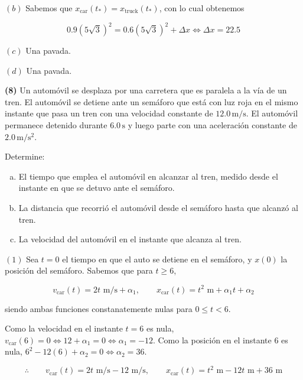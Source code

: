 \documentclass[12pt]{article}
\theoremstyle{definition}
\begin{document}
$(b)$ Sabemos que $x_{\text{car}}(t_*) = x_{\text{truck}}(t_*)$, con lo cual
obtenemos 

\begin{equation*}
    0.9(5\sqrt{3} )^2 = 0.6(5\sqrt{3} )^2 + \Delta x \iff \Delta x = 22.5
\end{equation*}

$(c)$ Una pavada. 

$(d)$ Una pavada.

\pagebreak 

\begin{shaded}
    \textbf{(8)} Un automóvil se desplaza por una carretera que es paralela a la vía de un tren. El automóvil se detiene ante un semáforo que está con luz roja en el mismo instante que pasa un tren con una velocidad constante de $12.0 \, \mathrm{m/s}$. El automóvil permanece detenido durante $6.0 \, \mathrm{s}$ y luego parte con una aceleración constante de $2.0 \, \mathrm{m/s^2}$.  

Determine:
\begin{enumerate}[(a)]
    \item El tiempo que emplea el automóvil en alcanzar al tren, medido desde el instante en que se detuvo ante el semáforo.
    \item La distancia que recorrió el automóvil desde el semáforo hasta que alcanzó al tren.
    \item La velocidad del automóvil en el instante que alcanza al tren.
\end{enumerate}
\end{shaded}

$(1)$ Sea $t = 0$ el tiempo en que el auto se detiene en el semáforo, y $x(0)$
la posición del semáforo. Sabemos que para $t \geq 6$,

\begin{equation*}
    v_{\text{car}}(t) = 2t \text{ m/s} + \alpha_1, \qquad x_{\text{car}}(t) =
    t^2 \text{ m} + \alpha_1 t + \alpha_2
\end{equation*}

siendo ambas funciones constanatemente nulas para $0 \leq t < 6$.

Como la velocidad en el instante $t=6$ es nula, $v_{\text{car}}(6) = 0 \iff 12 +
\alpha_1 = 0 \iff \alpha_1 = -12$. Como la posición en el instante 6 es nula,
$6^2 -12(6) + \alpha_2 = 0 \iff \alpha_2 = 36$.

\begin{equation*}
    \therefore \qquad v_{\text{car}}(t) = 2t \text{ m/s} - 12\text{ m/s}, \qquad x_{\text{car}}(t) =
    t^2 \text{ m} -12t \text{ m} + 36\text{ m}
\end{equation*}
\end{document}

